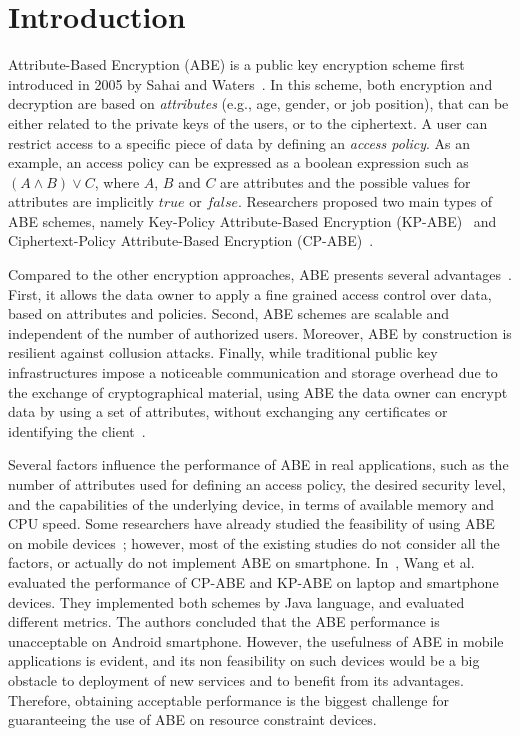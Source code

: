 \documentclass{sig-alternate-2013}
\begin{document}
\newpage
\section{Introduction} \label{sec:intro}

\sloppy
Attribute-Based Encryption (ABE) is a public key encryption scheme first introduced in 2005 by Sahai and Waters~\cite{sahai2005fuzzy}. In this scheme, both encryption and decryption are based on {\em attributes} (e.g., age, gender, or job position), that can be either related to the private keys of the users, or to the ciphertext. A user can restrict access to a specific piece of data by defining an {\em access policy}. As an example, an access policy can be expressed as a boolean expression such as $(A \wedge B)\vee C$, where $A$, $B$ and $C$ are attributes and the possible values for attributes are implicitly $true$ or $false$.
Researchers proposed two main types of ABE schemes, namely Key-Policy Attribute-Based Encryption (KP-ABE)~\cite{goyal2006attribute} and Ciphertext-Policy Attribute-Based Encryption (CP-ABE)~\cite{bethencourt2007ciphertext}. 


 Compared to the other encryption approaches, ABE presents several advantages~\cite{lee2013survey}. First, it allows the data owner to apply a fine grained access control over data, based on attributes and policies. Second, ABE schemes are scalable and independent of the number of authorized users. Moreover, ABE by construction is resilient against collusion attacks. Finally, while traditional public key infrastructures impose a noticeable communication and storage overhead due to the exchange of cryptographical material, using ABE the data owner can encrypt data by using a set of attributes, without exchanging any certificates or identifying the client~\cite{lee2013survey}. 





Several factors influence the performance of ABE in real applications, such as the number of attributes used for defining an access policy, the desired security level, and the capabilities of the underlying device, in terms of available memory and CPU speed. 
Some researchers have already studied the feasibility of using ABE on mobile devices~\cite{ABE_icc_2014}; however, most of the existing studies do not consider all the factors, or actually do not implement ABE on smartphone. In~\cite{ABE_icc_2014}, Wang et al. evaluated the performance of CP-ABE and KP-ABE on laptop and smartphone devices. They implemented both schemes by Java language, and evaluated different metrics. 
The authors concluded that the ABE performance is unacceptable on Android smartphone. However, the usefulness of ABE in mobile applications is evident, and its non feasibility on such devices would be a big obstacle to deployment of new services and to benefit from its advantages. Therefore, obtaining acceptable performance is the biggest challenge for guaranteeing the use of ABE on resource constraint devices.
\end{document}
